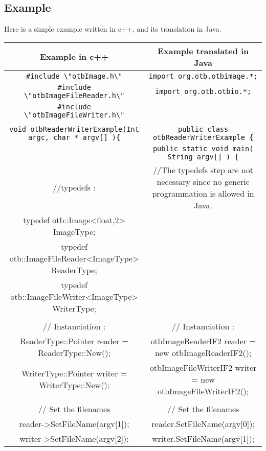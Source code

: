 \begin{landscape}
\subsection{Example}

Here is a simple example written in c++, and its translation in Java. 

\small
\begin{table}[!htbp]
\begin{center}
\begin{tabular}{|c|c|}
\hline
Example in c++                  &  Example translated in Java  \\
\hline

\verb$#include \"otbImage.h\"$            &       \verb$import org.otb.otbimage.*;$                                 \\
\verb$#include \"otbImageFileReader.h\"$  &       \verb$import org.otb.otbio.*;$                                    \\
\verb$#include \"otbImageFileWriter.h\"$  &                                                                        \\
                                          &                                                                         \\
\verb$void otbReaderWriterExample(Int argc, char * argv[] ){$ & \verb$public class otbReaderWriterExample {$        \\
                                                              &  \verb$public static void main( String argv[] ) {$  \\
//typedefs :                              &     //The typedefs step are not necessary since no generic programmation is allowed in Java.    \\
														  
typedef  otb::Image<float,2>   ImageType;             &           \\
typedef  otb::ImageFileReader<ImageType> ReaderType;  &           \\
typedef  otb::ImageFileWriter<ImageType> WriterType;  &            \\

                       &                                           \\
// Instanciation :     &                      // Instanciation :   \\

 ReaderType::Pointer reader = ReaderType::New();    &    otbImageReaderIF2 reader = new otbImageReaderIF2(); \\ 
 WriterType::Pointer writer = WriterType::New();    &      otbImageFileWriterIF2    writer  =  new otbImageFileWriterIF2(); \\
 & \\
 // Set the filenames                     & // Set the filenames \\
 reader->SetFileName(argv[1]);            & reader.SetFileName(argv[0]); \\
 writer->SetFileName(argv[2]);            & writer.SetFileName(argv[1]); \\


\end{tabular}
\end{center}
\end{table}
\end{landscape}

